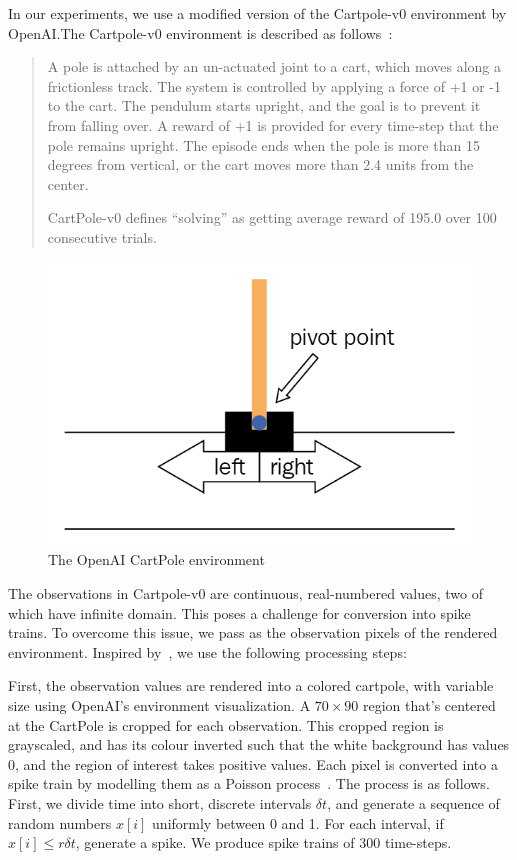 \documentclass[fyp]{socreport}
\begin{document}
In our experiments, we use a modified version of the Cartpole-v0 environment by
OpenAI.\@ The Cartpole-v0 environment is described as follows~\cite{openai_gym}:

\begin{quote} A pole is attached by an un-actuated joint to a cart, which moves
along a frictionless track. The system is controlled by applying a force of +1
or -1 to the cart. The pendulum starts upright, and the goal is to prevent it
from falling over. A reward of +1 is provided for every time-step that the pole
remains upright. The episode ends when the pole is more than 15 degrees from
vertical, or the cart moves more than 2.4 units from the center.

CartPole-v0 defines ``solving'' as getting average reward of 195.0 over 100
consecutive trials.

\end{quote}

\begin{figure}[htbp] \centering
  \includegraphics[width=.55\linewidth]{images/openai_gym.png}
  \caption{The OpenAI CartPole environment}
\end{figure}

The observations in Cartpole-v0 are continuous, real-numbered values, two of
which have infinite domain. This poses a challenge for conversion into spike
trains. To overcome this issue, we pass as the observation pixels of the
rendered environment. Inspired by~\cite{mnih2013playing}, we use the following
processing steps:

First, the observation values are rendered into a colored cartpole, with
variable size using OpenAI's environment visualization. A $70 \times 90$ region
that's centered at the CartPole is cropped for each observation. This cropped
region is grayscaled, and has its colour inverted such that the white background
has values 0, and the region of interest takes positive values. Each pixel is
converted into a spike train by modelling them as a Poisson
process~\cite{heeger2000poisson}. The process is as follows. First, we divide
time into short, discrete intervals \(\delta t\), and generate a sequence of
random numbers \(x[i]\) uniformly between 0 and 1. For each interval, if
\(x[i] \le r \delta t\), generate a spike. We produce spike trains of 300
time-steps.
\end{document}

